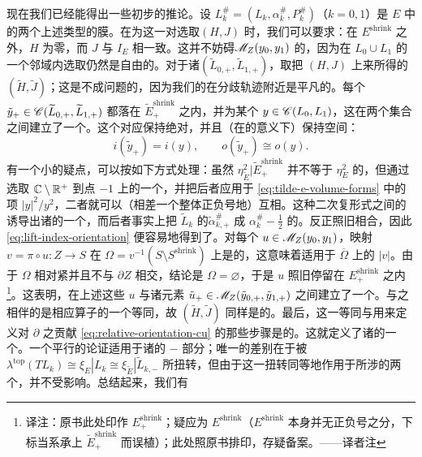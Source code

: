 现在我们已经能得出一些初步的推论。设 $L^{\#}_k=(L_k,\alpha^{\#}_k,P^{\#}_k)$（$k=0,1$）是 $E$ 中的两个上述类型的膜。在为这一对选取\trFloerDatum{}$(H,J)$ 时，我们可以要求：在 $E^{\mathrm{shrink}}$ 之外，$H$ 为零，而 $J$ 与 $I_E$ 相一致。这并不妨碍\trModuliSpace{}$\mathscr{M}_Z(y_0,y_1)$ 的\trRegularity，因为在 $L_0\cup L_1$ 的一个邻域内选取仍然是自由的。对于诸\trPreimage{}$(\widetilde{L}_{0,+},\widetilde{L}_{1,+})$，取把 $(H,J)$ \trLift{}上来所得的\trFloerDatum{}$(\widetilde{H},\widetilde{J})$；这是不成问题的，因为我们的\trFloerDatum{}在分歧轨迹附近是平凡的。每个 $\tilde{y}_+\in\mathscr{C}(\widetilde{L}_{0,+},\widetilde{L}_{1,+})$ 都落在 $\widetilde{E}^{\mathrm{shrink}}_+$ 之内，并\trProjection{}为某个 $y\in\mathscr{C}(L_0,L_1)$，这在两个集合之间建立了一个\trBijective。这个对应保持绝对\trIndex，并且（在\trCanonical{}\trIsomorphism{}的意义下）保持\trOrientation{}空间：
\begin{equation}\label{eq:lift-index-orientation}
i(\tilde{y}_+)=i(y),\qquad o(\tilde{y}_+)\cong o(y).
\end{equation}
有一个小的疑点，可以按如下方式处理：虽然 $\eta^2_{\widetilde{E}}|\widetilde{E}^{\mathrm{shrink}}_+$ 并不等于 $\eta^2_E$ 的\trPullback，但通过选取 $\mathbb{C}\setminus\mathbb{R}^+$ 到点 $-1$ 上的一个\trDeformationRetract，并把后者应用于 \eqref{eq:tilde-e-volume-forms} 中的项 $|y|^2/y^2$，二者就可以（相差一个整体正负号地）互相\trDeformation。这种二次复\trVolume{}形式之间的\trHomotopy{}诱导出诸\trGrading{}的一个\trHomotopy，而后者事实上把 $\widetilde{L}_k$ 的\trGrading{}$\tilde{\alpha}^{\#}_{k,+}$ \trDeformation{}成 $\alpha^{\#}_k-\tfrac{1}{2}$ 的\trPullback。\trPinStructure{}反正照旧相合，因此 \eqref{eq:lift-index-orientation} 便容易地得到了。对每个 $u\in\mathscr{M}_Z(y_0,y_1)$，映射 $v=\pi\circ u\colon Z\to S$ 在 $\Omega=v^{-1}(S\setminus S^{\mathrm{shrink}})$ 上是\trHolomorphic{}的，这意味着\trMaximumPrinciple{}适用于 $\overline{\Omega}$ 上的 $|v|$。由于 $\Omega$ 相对紧并且不与 $\partial Z$ 相交，结论是 $\Omega=\varnothing$，于是 $u$ 照旧停留在 $E^{\mathrm{shrink}}_+$ 之内\footnote{译注：原书此处印作 $E^{\mathrm{shrink}}_+$；疑应为 $E^{\mathrm{shrink}}$（$E^{\mathrm{shrink}}$ 本身并无正负号之分，下标当系承上 $\widetilde{E}^{\mathrm{shrink}}_+$ 而误植）；此处照原书排印，存疑备案。——译者注}。这表明，\trProjection{}在上述这些 $u$ 与诸元素 $\tilde{u}_+\in\mathscr{M}_Z(\tilde{y}_{0,+},\tilde{y}_{1,+})$ 之间建立了一个\trBijective。与之相伴的是相应\trLinearization{}算子的一个等同，故 $(\widetilde{H},\widetilde{J})$ 同样是\trRegular{}的。最后，这一等同与用来定义对\trFloer\trDifferential{} $\partial$ 之贡献 \eqref{eq:relative-orientation-cu} 的那些\trGluing{}步骤是\trCompatible{}的。这就定义了诸\trFloer\trCochainComplex{}的一个\trIsomorphism。一个平行的论证适用于诸\trPreimage{}的 $-$ 部分；唯一的差别在于\trPinStructure{}被 $\lambda^{\mathrm{top}}(TL_k)\cong\xi_E|L_k\cong\xi_{\widetilde{E}}|\widetilde{L}_{k,-}$ 所扭转，但由于这一扭转同等地作用于所涉的两个\trLagrange\trSubmanifold，\trFloerComplex{}并不受影响。总结起来，我们有\trCanonical{}\trIsomorphism
